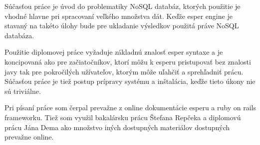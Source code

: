 Súčasťou práce je úvod do problematiky NoSQL databáz, ktorých použitie je vhodné hlavne pri spracovaní veľkého množstva dát. Keďže esper engine je stavaný na takéto úlohy bude pre ukladanie výsledkov použitá práve NoSQL databáza.

Použitie diplomovej práce vyžaduje základnú znalosť esper syntaxe a je koncipovaná ako pre začiatočníkov, ktorí môžu k esperu pristupovať bez znalosti javy tak pre pokročilých užívateľov, ktorým môže uľahčiť a sprehľadniť prácu. Súčasťou práce je tiež postup prípravy systému a inštalácia, keďže tieto úkony nie sú triviálne.

Pri písaní práce som čerpal prevažne z online dokumentácie esperu a ruby on rails frameworku. Tiež som využil bakalársku prácu Štefana Repčeka \cite{bp-repcek} a diplomovú prácu Jána Dema \cite{dp-demo} ako množstvo iných dostupných materiálov dostupných prevažne online.

\emptydoublepage
